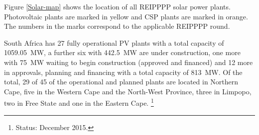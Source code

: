 
Figure \ref{Solar-map} shows the location of all REIPPPP solar power plants. Photovoltaic plants are marked in yellow and CSP plants are marked in orange. The numbers in the marks correspond to the applicable REIPPPP round.


%

South Africa has 27 fully operational PV plants with a total capacity of \SI{1059.05}{\mega\watt}, a further six with \SI{442.5}{\mega\watt} are under construction, one more with \SI{75}{\mega\watt} waiting to begin construction (approved and financed) and 12 more in approvals, planning and financing with a total capacity of \SI{813}{\mega\watt}. Of the total, 29 of 45 of the operational and planned plants are located in Northern Cape, five in the Western Cape and the North-West Province, three in Limpopo, two in Free State and one in the Eastern Cape. \cite{Forder2015}\footnote{Status: December 2015.}

